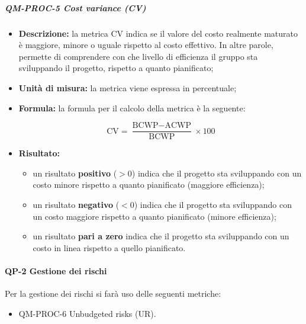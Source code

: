 			\subparagraph{QM-PROC-5 Cost variance (CV)}
			\begin{itemize}
				\item \textbf{Descrizione:} 
				la metrica CV indica se il valore del costo realmente maturato è maggiore, minore o uguale rispetto al costo effettivo. In altre parole, permette di comprendere con che livello di efficienza il gruppo sta sviluppando il progetto, rispetto a quanto pianificato;

				\item \textbf{Unità di misura:} 
				la metrica viene espressa in percentuale;

				\item \textbf{Formula:} 
				la formula per il calcolo della metrica è la seguente:

				\[
					\text{CV} = \frac{\text{BCWP} - \text{ACWP}}{\text{BCWP}} \times 100
				\]

				\item \textbf{Risultato:} 
				\begin{itemize}
					\item un risultato \textbf{positivo} (\(> 0\)) indica che il progetto sta sviluppando con un costo minore rispetto a quanto pianificato (maggiore efficienza);
					\item un risultato \textbf{negativo} (\(< 0\)) indica che il progetto sta sviluppando con un costo maggiore rispetto a quanto pianificato (minore efficienza);
					\item un risultato \textbf{pari a zero} indica che il progetto sta sviluppando con un costo in linea rispetto a quello pianificato.
				\end{itemize}
			\end{itemize}
		\paragraph{QP-2 Gestione dei rischi}

			Per la gestione dei rischi si farà uso delle seguenti metriche:

			\begin{itemize}
				\item QM-PROC-6 Unbudgeted risks (UR).
			\end{itemize}

